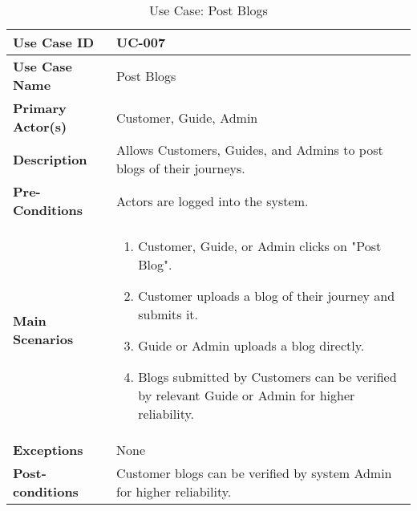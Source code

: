 \begin{table}[ht]
    \centering
    \begin{tabular}{|l|p{}|}
        \hline
        \textbf{Use Case ID} & UC-007 \\
        \hline
        \textbf{Use Case Name} & Post Blogs \\
        \hline
        \textbf{Primary Actor(s)} & Customer, Guide, Admin \\
        \hline
        \textbf{Description} & Allows Customers, Guides, and Admins to post blogs of their journeys. \\
        \hline
        \textbf{Pre-Conditions} & Actors are logged into the system. \\
        \hline
        \textbf{Main Scenarios} & 
        \begin{enumerate}[label=\arabic*.,itemsep=0pt]
            \item Customer, Guide, or Admin clicks on "Post Blog".
            \item Customer uploads a blog of their journey and submits it.
            \item Guide or Admin uploads a blog directly.
            \item Blogs submitted by Customers can be verified by relevant Guide or Admin for higher reliability.
        \end{enumerate} \\
        \hline
        \textbf{Exceptions} & None \\
        \hline
        \textbf{Post-conditions} & Customer blogs can be verified by system Admin for higher reliability. \\
        \hline
    \end{tabular}
    \label{tab:use-case-post-blogs}
    \caption{Use Case: Post Blogs}
\end{table}


